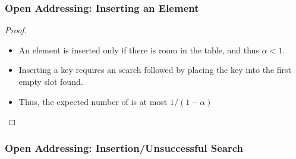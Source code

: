 \documentclass[UTF8,11pt]{beamer}
\begin{document}
\begin{frame}
\frametitle{Open Addressing: Inserting an Element}

\begin{center}
	\pause
	\begin{proof}
		\begin{itemize}
			\item 	An element is inserted only if there is room in the table, and thus $\alpha<1$.
			\item Inserting a key requires an  search followed by placing the key into the first empty slot found. 
			\item Thus, the expected number of  is at most $1/(1-\alpha)$ 
		\end{itemize}

	\end{proof}
\end{center}
\end{frame}

\begin{frame}
\frametitle{Open Addressing: Insertion/Unsuccessful Search}
\begin{center}
	
\end{center}
\end{frame}
\end{document}
